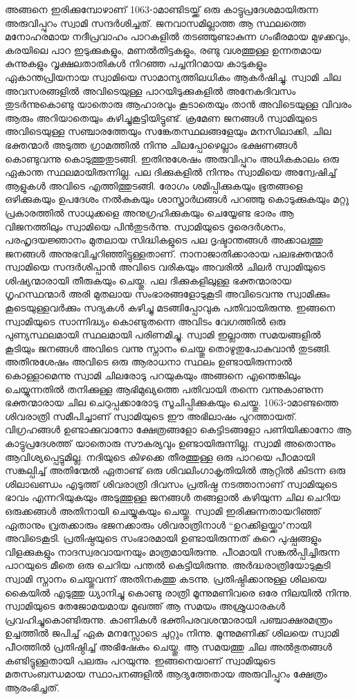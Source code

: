 \documentclass[12pt,openany]{book}
\begin{document}
	അങ്ങനെ ഇരിക്കുമ്പോഴാണ് 1063-ാമാണ്ടിടയ്ക്ക് ഒരു കാട്ടുപ്രദേശമായിരുന്ന അരുവിപ്പുറം സ്വാമി സന്ദർശിച്ചത്. ജനവാസമില്ലാത്ത ആ സ്ഥലത്തെ മനോഹരമായ നദീപ്രവാഹം പാറകളിൽ തടഞ്ഞുണ്ടാകുന്ന ഗംഭീരമായ മുഴക്കവും, കരയിലെ പാറ ഇടുക്കുകളും, മണൽതിട്ടകളും, രണ്ടു വശത്തുള്ള ഉന്നതമായ കുന്നുകളും വൃക്ഷലതാതികൾ നിറഞ്ഞ പച്ചനിറമായ കാടുകളും ഏകാന്തപ്രിയനായ സ്വാമിയെ സാമാന്യത്തിലധികം ആകർഷിച്ചു. സ്വാമി ചില അവസരങ്ങളിൽ അവിടെയുള്ള പാറയിടുക്കുകളിൽ അനേകദിവസം തുടർന്നുകൊണ്ടു യാതൊരു ആഹാരവും കൂടാതെയും താൻ അവിടെയുള്ള വിവരം ആരും അറിയാതെയും കഴിച്ചുകൂട്ടിയിട്ടുണ്ട്. ക്രമേണ ജനങ്ങൾ സ്വാമിയുടെ അവിടെയുള്ള സഞ്ചാരത്തേയും സങ്കേതസ്ഥലങ്ങളേയും മനസിലാക്കി, ചില ഭക്തന്മാർ അടുത്ത ഗ്രാമത്തിൽ നിന്നു ചിലപ്പോഴെല്ലാം ഭക്ഷണങ്ങൾ കൊണ്ടുവന്നു കൊടുത്തുതുടങ്ങി. ഇതിനുശേഷം അരുവിപ്പുറം അധികകാലം ഒരു ഏകാന്ത സ്ഥലമായിരുന്നില്ല. പല ദിക്കുകളിൽ നിന്നും സ്വാമിയെ അന്വേഷിച്ച് ആളുകൾ അവിടെ എത്തിത്തുടങ്ങി. രോഗം ശമിപ്പിക്കുകയും ഭൂതങ്ങളെ ഒഴിക്കുകയും ഉപദേശം നൽകുകയും ശാസ്ത്രാർഥങ്ങൾ പറഞ്ഞു കൊടുക്കുകയും മറ്റു പ്രകാരത്തിൽ സാധുക്കളെ അനുഗ്രഹിക്കുകയും ചെയ്യേണ്ട ഭാരം ആ വിജനത്തിലും സ്വാമിയെ പിൻതുടർന്നു. സ്വാമിയുടെ ദൂരെദർശനം, പരഹൃദയജ്ഞാനം മുതലായ സിദ്ധികളുടെ പല ദൃഷ്ടാന്തങ്ങൾ അക്കാലത്തു ജനങ്ങൾ അനുഭവിച്ചറിഞ്ഞിട്ടുള്ളതാണ്. നാനാജാതിക്കാരായ പലഭക്തന്മാർ സ്വാമിയെ സന്ദർശിപ്പാൻ അവിടെ വരികയും അവരിൽ ചിലർ സ്വാമിയുടെ ശിഷ്യന്മാരായി തീരുകയും ചെയ്തു. പല ദിക്കുകളിലുള്ള ഭക്തന്മാരായ ഗൃഹസ്ഥന്മാർ അരി മുതലായ സംഭാരങ്ങളോടുകൂടി അവിടെവന്നു സ്വാമിക്കും കൂടെയുള്ളവർക്കും സദ്യകൾ കഴിച്ചു മടങ്ങിപ്പോവുക പതിവായിരുന്നു. ഇങ്ങനെ സ്വാമിയുടെ സാന്നിദ്ധ്യം കൊണ്ടുതന്നെ അവിടം വേഗത്തിൽ ഒരു പുണ്യസ്ഥലമായി സ്ഥലമായി പരിണമിച്ചു. സ്വാമി ഇല്ലാത്ത സമയങ്ങളിൽ കൂടിയും ജനങ്ങൾ അവിടെ വന്നു സ്നാനം ചെയ്തു തൊഴുതുപോകുവാൻ തുടങ്ങി. അതിനുശേഷം അവിടെ ഒരു ആരാധനാ സ്ഥലം ഉണ്ടായിരുന്നാൽ കൊള്ളാമെന്നു സ്വാമി ചിലരോടു പറയുകയും അങ്ങനെ എന്തെങ്കിലും ചെയ്യുന്നതിൽ തനിക്കുള്ള ആഭിമുഖ്യത്തെ പതിവായി തന്നെ വന്നുകാണുന്ന ഭക്തന്മാരായ ചില ചെറുപ്പക്കാരോടു സൂചിപ്പിക്കുകയും ചെയ്തു. 1063-ാമാണ്ടത്തെ ശിവരാത്രി സമീപിച്ചാണ് സ്വാമിയുടെ ഈ അഭിലാഷം പുറത്തായത്. വിഗ്രഹങ്ങൾ ഉണ്ടാക്കുവാനോ ക്ഷേത്രങ്ങളോ കെട്ടിടങ്ങളോ പണിയിക്കാനോ ആ കാട്ടുപ്രദേശത്ത് യാതൊരു സൗകര്യവും ഉണ്ടായിരുന്നില്ല. സ്വാമി അതൊന്നും ആവിശ്യപ്പെട്ടുമില്ല. നദിയുടെ കിഴക്കെ തീരത്തുള്ള ഒരു പാറയെ പീഠമായി സങ്കല്പിച്ച് അതിന്മേൽ ഏതാണ്ട് ഒരു ശിവലിംഗാകൃതിയിൽ ആറ്റിൽ കിടന്ന ഒരു ശിലാഖണ്ഡം എടുത്ത് ശിവരാത്രി ദിവസം പ്രതിഷ്ഠ നടത്താനാണ് സ്വാമിയുടെ ഭാവം എന്നറിയുകയും അടുത്തുള്ള ജനങ്ങൾ തങ്ങളാൽ കഴിയുന്ന ചില ചെറിയ ഒരുക്കങ്ങൾ അതിനായി ചെയ്യുകയും ചെയ്തു. സ്വാമി ഇരിക്കുന്നതായറിഞ്ഞ് ഏതാനും വ്രതക്കാരും ഭജനക്കാരും ശിവരാത്രിനാൾ ``ഉറക്കിളയ്ക്കാ"നായി അവിടെകൂടി. പ്രതിഷ്ഠയുടെ സംഭാരമായി ഉണ്ടായിരുന്നത് കുറെ പുഷ്പങ്ങളും വിളക്കുകളും നാദസ്വരവായനയും മാത്രമായിരുന്നു. പീഠമായി സങ്കൽപ്പിച്ചിരുന്ന പാറയുടെ മീതെ ഒരു ചെറിയ പന്തൽ കെട്ടിയിരുന്നു. അർദ്ധരാത്രിയോടുകൂടി സ്വാമി സ്നാനം ചെയ്തുവന്ന് അതിനകത്തു കടന്നു. പ്രതിഷ്ഠിക്കാനുള്ള ശിലയെ കൈയിൽ എടുത്തു ധ്യാനിച്ചു കൊണ്ടു രാത്രി മൂന്നുമണിവരെ ഒരേ നിലയിൽ നിന്നു. സ്വാമിയുടെ തേജോമയമായ മുഖത്ത് ആ സമയം അശ്രുധാരകൾ പ്രവഹിച്ചുകൊണ്ടിരുന്നു. കാണികൾ ഭക്തിപരവശന്മാരായി പഞ്ചാക്ഷരമന്ത്രം ഉച്ചത്തിൽ ജപിച്ച് ഏക മനസ്സോടെ ചുറ്റും നിന്നു. മൂന്നുമണിക്ക് ശിലയെ സ്വാമി പീഠത്തിൽ പ്രതിഷ്ഠിച്ച് അഭിഷേകം ചെയ്തു. ആ സമയത്തു ചില അൽഭുതങ്ങൾ കണ്ടിട്ടുള്ളതായി പലരും പറയുന്നു. ഇങ്ങനെയാണ് സ്വാമിയുടെ മതസംബന്ധമായ സ്ഥാപനങ്ങളിൽ ആദ്യത്തേതായ അരുവിപ്പുറം ക്ഷേത്രം ആരംഭിച്ചത്.
	
\end{document}
